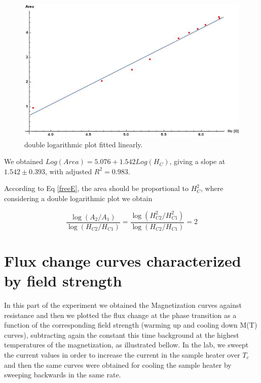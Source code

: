 \documentclass[openany,11pt,a4paper]{report}
\begin{document}
\begin{figure}[H]
\begin{center}
\includegraphics[scale=.6]{doublog.jpg}
\caption{double logarithmic plot fitted linearly.}
\end{center}
\end{figure}


We obtained $Log(Area)= 5.076 + 1.542 Log(H_{C})$, giving a slope at $1.542 \pm 0.393$, with adjusted $R^{2}=0.983$.

According to Eq \ref{freeE}, the area should be proportional to $H_{C}^{2}$, where considering a double logarithmic plot we obtain 

\begin{equation}
\frac{\log \left(A_{2} / A_{1}\right)}{\log \left(H_{C 2} / H_{C 1}\right)}=\frac{\log \left(H_{C 2}^{2} / H_{C 1}^{2}\right)}{\log \left(H_{C 2} / H_{C 1}\right)}=2
\end{equation}





\section{Flux change curves characterized by field
strength }
In this part of the experiment we obtained the Magnetization curves against resistance and then we plotted the flux change at the phase transition as a function of the corresponding field
strength (warming up and cooling down M(T) curves), subtracting again the constant this time background at the highest temperatures of the magnetization, as illustrated bellow. In the lab, we sweept the current values in order to increase the current in the sample heater over $T_{c}$ and then the same curves were obtained for cooling the sample heater by sweeping backwards in the same rate.\\
\end{document}
